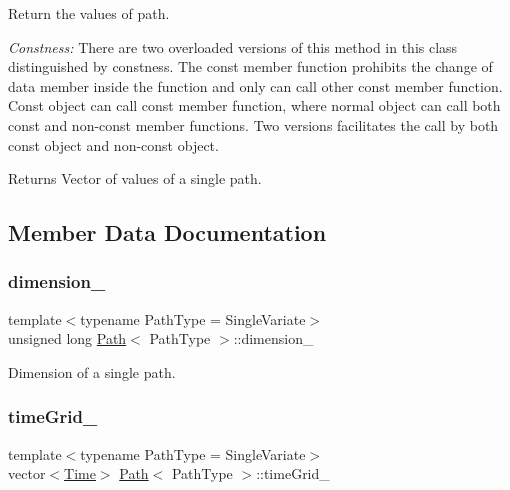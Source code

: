Return the values of path. 

{\itshape Constness\+:} There are two overloaded versions of this method in this class distinguished by constness. The const member function prohibits the change of data member inside the function and only can call other const member function. Const object can call const member function, where normal object can call both const and non-\/const member functions. Two versions facilitates the call by both const object and non-\/const object. \begin{DoxyReturn}{Returns}
Vector of values of a single path. 
\end{DoxyReturn}


\subsection{Member Data Documentation}
\hypertarget{class_path_a1011b18bd2dc22cc4b2151db076fb6f5}{}\label{class_path_a1011b18bd2dc22cc4b2151db076fb6f5} 
\subsubsection{\texorpdfstring{dimension\+\_\+}{dimension\_}}
{\footnotesize\ttfamily template$<$typename Path\+Type = Single\+Variate$>$ \\
unsigned long \hyperlink{class_path}{Path}$<$ Path\+Type $>$\+::dimension\+\_\+\hspace{0.3cm}{\ttfamily [private]}}



Dimension of a single path. 

\hypertarget{class_path_a23350d9575ae171881cd45dc1ce2a701}{}\label{class_path_a23350d9575ae171881cd45dc1ce2a701} 
\subsubsection{\texorpdfstring{time\+Grid\+\_\+}{timeGrid\_}}
{\footnotesize\ttfamily template$<$typename Path\+Type = Single\+Variate$>$ \\
vector$<$\hyperlink{_name_def_8h_ac2d3e0ba793497bcca555c7c2cf64ff3}{Time}$>$ \hyperlink{class_path}{Path}$<$ Path\+Type $>$\+::time\+Grid\+\_\+\hspace{0.3cm}{\ttfamily [private]}}



